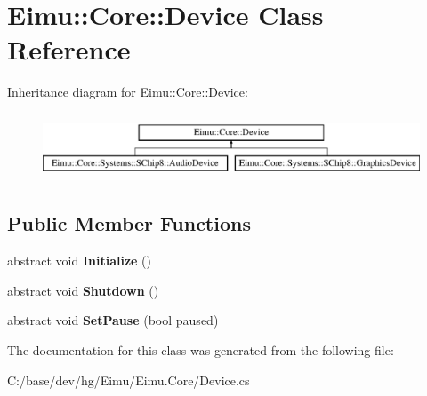 \hypertarget{class_eimu_1_1_core_1_1_device}{
\section{Eimu::Core::Device Class Reference}
\label{class_eimu_1_1_core_1_1_device}
}
Inheritance diagram for Eimu::Core::Device:\begin{figure}[H]
\begin{center}
\leavevmode
\includegraphics[height=2.000000cm]{class_eimu_1_1_core_1_1_device}
\end{center}
\end{figure}
\subsection*{Public Member Functions}
\begin{DoxyCompactItemize}
\item 
\hypertarget{class_eimu_1_1_core_1_1_device_ae4922bc554b7c1683b571d3baeb3bf0e}{
abstract void {\bfseries Initialize} ()}
\label{class_eimu_1_1_core_1_1_device_ae4922bc554b7c1683b571d3baeb3bf0e}

\item 
\hypertarget{class_eimu_1_1_core_1_1_device_a91771728c330ee5233ef9cc50b403db5}{
abstract void {\bfseries Shutdown} ()}
\label{class_eimu_1_1_core_1_1_device_a91771728c330ee5233ef9cc50b403db5}

\item 
\hypertarget{class_eimu_1_1_core_1_1_device_a56b924c9e49b1c1b3bed742f69133547}{
abstract void {\bfseries SetPause} (bool paused)}
\label{class_eimu_1_1_core_1_1_device_a56b924c9e49b1c1b3bed742f69133547}

\end{DoxyCompactItemize}


The documentation for this class was generated from the following file:\begin{DoxyCompactItemize}
\item 
C:/base/dev/hg/Eimu/Eimu.Core/Device.cs\end{DoxyCompactItemize}

